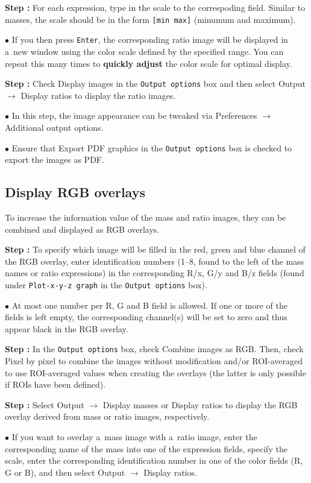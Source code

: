 \documentclass[a4paper, 11pt]{article}
\newcommand{\ttt}[1]{\texttt{#1}}
\newcommand{\lans}[1]{{\color{magenta}#1}}
\newcommand{\lanscb}[1]{{\color{darkgreen}#1}}
\newcommand{\lanstf}[1]{{\color{cyan}#1}}
\newcommand\ra{\rightarrow}
\newcounter{step}
\newcommand\s{\addtocounter{step}{1}\noindent\textbf{Step \thestep:}{ }}
\newcommand\bul{\noindent$\bullet${ }}
\newcommand\bb[1]{\textbf{#1}}
\begin{document}
\s For each expression, type in the \lanstf{scale} to the correspoding field. Similar to masses, the scale should be in the form \ttt{[min max]} (minumum and maximum). 

\bul If you then press \ttt{Enter}, the corresponding ratio image will be displayed in a~new window using the color scale defined by the specified range. You can repeat this many times to \bb{quickly adjust} the color scale for optimal display.

\s Check \lanscb{Display images} in the \ttt{Output options} box and then select \lans{Output} $\ra$ \lans{Display ratios} to display the ratio images.

\bul In this step, the image appearance can be tweaked via \lans{Preferences} $\ra$ \lans{Additional output options}.

\bul Ensure that \lanscb{Export PDF graphics} in the \ttt{Output options} box is checked to export the images as PDF.


\subsection{Display RGB overlays}
\setcounter{step}{0}

To increase the information value of the mass and ratio images, they can be combined and displayed as RGB overlays.

\s To specify which image will be filled in the red, green and blue channel of the RGB overlay, enter identification numbers (1--8, found to the left of the mass names or ratio expressions) in the corresponding \lanstf{R/x}, \lanstf{G/y} and \lanstf{B/z} fields (found under \ttt{Plot-x-y-z graph} in the \ttt{Output options} box).

\bul At most one number per R, G and B field is allowed. If one or more of the fields is left empty, the corresponding channel(s) will be set to zero and thus appear black in the RGB overlay.

\s In the \ttt{Output options} box, check \lanscb{Combine images as RGB}. Then, check \lanscb{Pixel by pixel} to combine the images without modification and/or \lanscb{ROI-averaged} to use ROI-averaged values when creating the overlays (the latter is only possible if ROIs have been defined).

\s Select \lans{Output} $\ra$ \lans{Display masses} or \lans{Display ratios} to display the RGB overlay derived from mass or ratio images, respectively.

\bul If you want to overlay a~mass image with a~ratio image, enter
the corresponding name of the mass into one of the \lanstf{expression} fields, specify the scale, enter the corresponding identification number in one of the \lanstf{color} fields (R, G or B), and then select \lans{Output} $\ra$ \lans{Display ratios}. 
\end{document}
